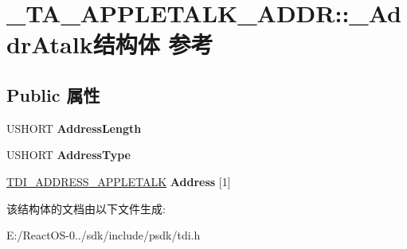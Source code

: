 \hypertarget{struct___t_a___a_p_p_l_e_t_a_l_k___a_d_d_r_1_1___addr_atalk}{}\section{\+\_\+\+T\+A\+\_\+\+A\+P\+P\+L\+E\+T\+A\+L\+K\+\_\+\+A\+D\+DR\+:\+:\+\_\+\+Addr\+Atalk结构体 参考}
\label{struct___t_a___a_p_p_l_e_t_a_l_k___a_d_d_r_1_1___addr_atalk}
\subsection*{Public 属性}
\begin{DoxyCompactItemize}
\item 
\mbox{\label{struct___t_a___a_p_p_l_e_t_a_l_k___a_d_d_r_1_1___addr_atalk_a5b3683f842de59c362b0394b3c0a2a4b}} 
U\+S\+H\+O\+RT {\bfseries Address\+Length}
\item 
\mbox{\label{struct___t_a___a_p_p_l_e_t_a_l_k___a_d_d_r_1_1___addr_atalk_ae2d9e7ed4afc1326dd499afb313fa0a5}} 
U\+S\+H\+O\+RT {\bfseries Address\+Type}
\item 
\mbox{\label{struct___t_a___a_p_p_l_e_t_a_l_k___a_d_d_r_1_1___addr_atalk_a97ea6f5b9705821a00c82dba7ae8fcfc}} 
\hyperlink{struct___t_d_i___a_d_d_r_e_s_s___a_p_p_l_e_t_a_l_k}{T\+D\+I\+\_\+\+A\+D\+D\+R\+E\+S\+S\+\_\+\+A\+P\+P\+L\+E\+T\+A\+LK} {\bfseries Address} \mbox{[}1\mbox{]}
\end{DoxyCompactItemize}


该结构体的文档由以下文件生成\+:\begin{DoxyCompactItemize}
\item 
E\+:/\+React\+O\+S-\/0../sdk/include/psdk/tdi.\+h\end{DoxyCompactItemize}
